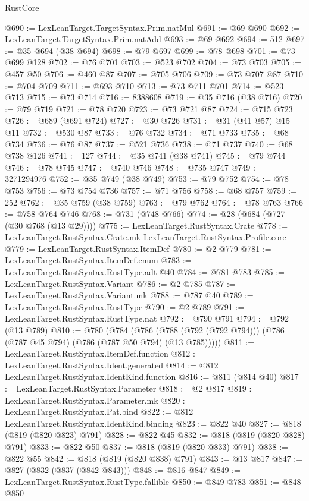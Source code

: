 \begin{lexlean}{RustCore}
\begin{coremodule}
@690 := LexLeanTarget.TargetSyntax.Prim.natMul
@691 := @69 @690
@692 := LexLeanTarget.TargetSyntax.Prim.natAdd
@693 := @69 @692
@694 := 512
@697 := @35 @694 (@38 @694)
@698 := @79 @697
@699 := @78 @698
@701 := @73 @699 @128
@702 := @76 @701
@703 := @523 @702
@704 := @73 @703
@705 := @457 @50
@706 := @460 @87
@707 := @705 @706
@709 := @73 @707 @87
@710 := @704 @709
@711 := @693 @710
@713 := @73 @711 @701
@714 := @523 @713
@715 := @73 @714
@716 := 8388608
@719 := @35 @716 (@38 @716)
@720 := @79 @719
@721 := @78 @720
@723 := @73 @721 @87
@724 := @715 @723
@726 := @689 (@691 @724)
@727 := @30 @726
@731 := @31 (@41 @57) @15 @11
@732 := @530 @87
@733 := @76 @732
@734 := @71 @733
@735 := @68 @734
@736 := @76 @87
@737 := @521 @736
@738 := @71 @737
@740 := @68 @738 @126
@741 := 127
@744 := @35 @741 (@38 @741)
@745 := @79 @744
@746 := @78 @745
@747 := @740 @746
@748 := @735 @747
@749 := 3271294976
@752 := @35 @749 (@38 @749)
@753 := @79 @752
@754 := @78 @753
@756 := @73 @754 @736
@757 := @71 @756
@758 := @68 @757
@759 := 252
@762 := @35 @759 (@38 @759)
@763 := @79 @762
@764 := @78 @763
@766 := @758 @764 @746
@768 := @731 (@748 @766)
@774 := @28 (@684 (@727 (@30 @768 (@13 @29))))
@775 := LexLeanTarget.RustSyntax.Crate
@778 := LexLeanTarget.RustSyntax.Crate.mk LexLeanTarget.RustSyntax.Profile.core
@779 := LexLeanTarget.RustSyntax.ItemDef
@780 := @2 @779
@781 := LexLeanTarget.RustSyntax.ItemDef.enum
@783 := LexLeanTarget.RustSyntax.RustType.adt @40
@784 := @781 @783
@785 := LexLeanTarget.RustSyntax.Variant
@786 := @2 @785
@787 := LexLeanTarget.RustSyntax.Variant.mk
@788 := @787 @40
@789 := LexLeanTarget.RustSyntax.RustType
@790 := @2 @789
@791 := LexLeanTarget.RustSyntax.RustType.nat
@792 := @790 @791
@794 := @792 (@13 @789)
@810 := @780
    (@784 (@786 (@788 (@792 (@792 @794))) (@786 (@787 @45 @794) (@786 (@787 @50 @794) (@13 @785)))))
@811 := LexLeanTarget.RustSyntax.ItemDef.function
@812 := LexLeanTarget.RustSyntax.Ident.generated
@814 := @812 LexLeanTarget.RustSyntax.IdentKind.function
@816 := @811 (@814 @40)
@817 := LexLeanTarget.RustSyntax.Parameter
@818 := @2 @817
@819 := LexLeanTarget.RustSyntax.Parameter.mk
@820 := LexLeanTarget.RustSyntax.Pat.bind
@822 := @812 LexLeanTarget.RustSyntax.IdentKind.binding
@823 := @822 @40
@827 := @818 (@819 (@820 @823) @791)
@828 := @822 @45
@832 := @818 (@819 (@820 @828) @791)
@833 := @822 @50
@837 := @818 (@819 (@820 @833) @791)
@838 := @822 @55
@842 := @818 (@819 (@820 @838) @791)
@843 := @13 @817
@847 := @827 (@832 (@837 (@842 @843)))
@848 := @816 @847
@849 := LexLeanTarget.RustSyntax.RustType.fallible
@850 := @849 @783
@851 := @848 @850

\end{coremodule}
\end{lexlean}
